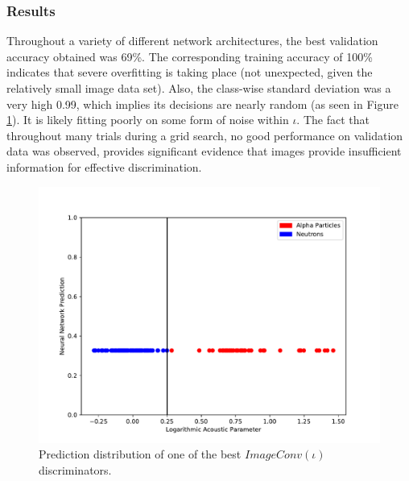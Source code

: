 \documentclass[10pt]{article}
\begin{document}
\subsubsection{Results}

Throughout a variety of different network architectures, the best validation accuracy obtained was 69\%. The corresponding training accuracy of 100\% indicates that severe overfitting is taking place (not unexpected, given the relatively small image data set). Also, the class-wise standard deviation was a very high 0.99, which implies its decisions are nearly random (as seen in Figure \ref{image_hist}). It is likely fitting poorly on some form of noise within $\iota$. The fact that throughout many trials during a grid search, no good performance on validation data was observed, provides significant evidence that images provide insufficient information for effective discrimination.

\begin{figure}[h]
    \centering
    \includegraphics[width=\textwidth]{image_hist}
    \caption{\label{image_hist} Prediction distribution of one of the best $ImageConv(\iota)$ discriminators.}
\end{figure}
\end{document}
